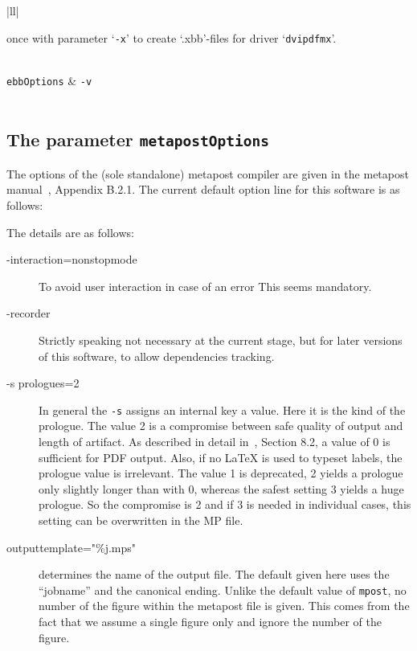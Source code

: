 \begin{longtable}{|ll|}
{\begin{minipage}{0.95\linewidth}
once with parameter `\texttt{-x}' 
to create `.xbb'-files for driver `\texttt{dvipdfmx}'. 
\end{minipage}
} \\
\texttt{ebbOptions} & \texttt{-v} \\
 \\
\end{longtable}

\subsection{The parameter \texttt{metapostOptions}}%
\label{subsec:metapostOptions}

The options of the (sole standalone) metapost compiler 
are given in the metapost manual~\cite{MPost24}, Appendix B.2.1. 
The current default option line for this software is as follows: 
%
\begin{center}
  {\scriptsize\texttt{\metapostOptions}}
\end{center}

The details are as follows: 
%
\begin{description}
  \item[-interaction=nonstopmode] To avoid user interaction in case of an error 
  This seems mandatory. 
  \item[-recorder] Strictly speaking not necessary at the current stage, 
    but for later versions of this software, to allow dependencies tracking. 
  \item[-s prologues=2] In general the \texttt{-s} assigns an internal key a value. 
  Here it is the kind of the prologue. 
  The value 2 is a compromise between safe quality of output and length of artifact. 
  As described in detail in~\cite{MPost24}, Section 8.2, 
  a value of 0 is sufficient for PDF output. 
  Also, if no \LaTeX{} is used to typeset labels, the prologue value is irrelevant. 
  The value 1 is deprecated, 2 yields a prologue only slightly longer than with 0, 
  whereas the safest setting 3 yields a huge prologue. 
  So the compromise is 2 and if 3 is needed in individual cases, 
  this setting can be overwritten in the MP file. 
  \item[outputtemplate="\%j.mps"] determines the name of the output file. %
  The default given here uses the ``jobname'' and the canonical ending. 
  Unlike the default value of \texttt{mpost}, 
  no number of the figure within the metapost file is given. 
  This comes from the fact that we assume a single figure only 
  and ignore the number of the figure. 
  \end{description}


